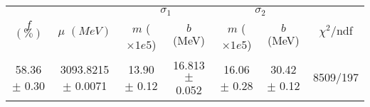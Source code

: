 \begin{tabular}{c|c|cc|cc||c}
 \multirow{2}{*}{$f$ $(\%)$} & \multirow{2}{*}{$\mu$ $(MeV)$} & \multicolumn{2}{|c|}{$\sigma_1$} & \multicolumn{2}{|c||}{$\sigma_2$} & \multirow{2}{*}{$\chi^2/$ndf} \\
 & & $m$ ($\times1e5$) & $b$ (MeV) & $m$ ($\times1e5$) & $b$ (MeV) & \\
\hline
58.36 $\pm$ 0.30 & 3093.8215 $\pm$ 0.0071 & 13.90 $\pm$ 0.12 & 16.813 $\pm$ 0.052 & 16.06 $\pm$ 0.28 & 30.42 $\pm$ 0.12 & 8509/197\\
\end{tabular}
